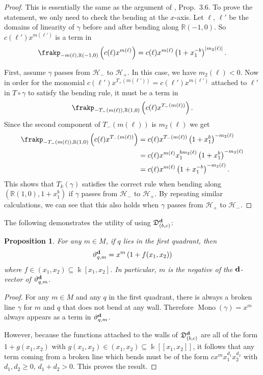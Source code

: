 \documentclass[11pt]{amsart}
\newtheorem{prop}[theorem]{Proposition}
\theoremstyle{remark}
\numberwithin{equation}{section}
\newcommand{\RR}{\mathbb{R}}
\newcommand{\fD}{\mathfrak{D}}
\newcommand{\bfd}{{\bf d}}
\newcommand{\Mono}{\operatorname{Mono}}
\begin{document}
\begin{proof}
  This is essentially the same as the argument of \cite{GHKK}, Prop.\ 3.6.  To
  prove the statement, we only need to check the bending at the $x$-axis. Let
  $\ell$, $\ell'$ be the domains of linearity of $\gamma$ before and after bending
  along $\RR (-1,0)$. So $c(\ell') x^{m(\ell')}$ is a term in 
  \[
    \frakp_{-m(\ell),\RR(-1,0)} \left(c(\ell) x^{m(\ell)}\right)
    = 
    c(\ell) x^{m(\ell)} \left(1+x_1^{-b}\right) ^{|m_2(\ell)|}.
  \]

  First, assume $\gamma$ passes from $\mathcal{H}_-$ to $\mathcal{H}_+$. In this
  case, we have $m_2(\ell) < 0$. Now in order for the monomial
  $c(\ell')x^{T_+(m(\ell'))} =c(\ell')x^{m(\ell')}$ attached to $\ell'$ in
  $T\circ\gamma$ to satisfy the bending rule, it must be a term in
  \[
    \frakp_{-T_-(m(\ell)),\RR (1,0)} \left(c(\ell) x^{T_-(m(\ell))}\right). 
  \]
  Since the second component of $T_-(m(\ell))$ is $m_2(\ell)$ we get
  \begin{align*} 
    \frakp_{-T_-(m(\ell)),\RR (1,0)} \left(c(\ell) x^{T_-(m(\ell))}\right) 
    & =
    c(\ell) x^{T_-(m(\ell))} \left(1+x_1^b\right) ^{-m_2(\ell)}
    \\
    & = 
    c(\ell) x^{m(\ell)} x_1^{b m_2(\ell)} 
    \left(1+x_1^b\right)^{-m_2(\ell)} 
    \\
    & = 
    c(\ell) x^{m(\ell)} \left(1+x_1^{-b}\right) ^{-m_2(\ell)}.
  \end{align*}
  This shows that $T_k(\gamma)$ satisfies the correct rule when bending along
  $(\RR (1,0), 1+x_1^b)$ if $\gamma$ passes from $\mathcal{H}_-$ to
  $\mathcal{H}_+$. By repeating similar calculations, we can see that this also
  holds when $\gamma$ passes from $\mathcal{H}_+$ to $\mathcal{H}_-$.
\end{proof}

The following demonstrates the utility of using $\fD_{(b,c)}^\bfd$:

\begin{prop}
  For any  $m\in M$, if $q$ lies in the first quadrant, then 
  \[
    \vartheta^\bfd_{q, m}=x^{m}\left(1+f(x_1,x_2)\right)
  \]
  where $f\in (x_1,x_2)\subseteq \Bbbk[x_1,x_2]$.
  In particular, $m$ is the negative of the $\bfd$-vector of
  $\vartheta^\bfd_{q,m}$.
\end{prop}

\begin{proof}
  For any $m\in M$ and any $q$ in the first quadrant, there is always a broken
  line $\gamma$ for $m$ and $q$ that does not bend at any wall. Therefore $\Mono
  (\gamma) = x^{m}$ always appears as a term in $\vartheta^\bfd_{q,m}$.

  However, because the functions attached to the walls of
  $\fD_{(b,c)}^\bfd$ are all of the form $1+g(x_1,x_2)$ with $g(x_1,x_2) \in
  (x_1,x_2) \subseteq \Bbbk[[x_1,x_2]]$, it follows that any term coming from a
  broken line which bends must be of the form $cx^{m}x_1^{d_1}x_2^{d_2}$ with
  $d_1,d_2\ge 0$, $d_1+d_2>0$. This proves the result.
\end{proof}
\end{document}
